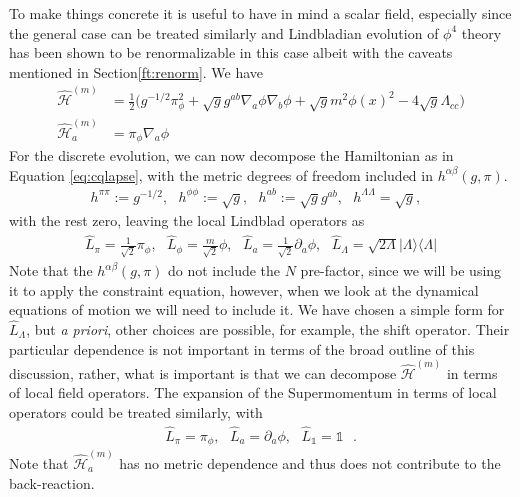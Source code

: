 \documentclass[aps,pra,showpacs,citeautoscript,amsmath,amssymb,floatfix,superscriptaddress,bbm, verbatim,amsfonts,changes,12pt,nofootinbib,longbibliography]{revtex4-2}
\newcommand{\id}{\mathbb{1}}
\newcommand{\proj}[1]{|#1\rangle\!\langle#1|}
\def\s{\,\,\,\,}
\def\L{{\hat{L}}}
\def\gfdet{\sqrt{g}}
\def\qham{\hat{\mathcal H}^{(m)}} %
\def\qmom{\hat{\mathcal{H}}^{(m)}}
\def\ab{^{\alpha\beta}}
\def\gpi{(g,\pi)}
\def\xd{}%
\begin{document}
To make things concrete it is useful to have in mind a scalar field, especially since the general case can be treated similarly and Lindbladian evolution of $\phi^4$ theory has been shown to be renormalizable in this case\cite{baidya2017renormalization}\label{par:caveats} albeit with the caveats mentioned in Section\ref{ft:renorm}. %
We have\cite{smear_foot}
\begin{align}
\qham
&=\frac{1}{2}\Big({g}^{-1/2}\pi_\phi^2+\sqrt{g}g^{ab}\nabla_a\phi\nabla_b\phi+\sqrt{g}m^2\phi(x)^2
-4\sqrt{g}\Lambda_{cc}\Big)
\label{eq:scalarTNN}\\
\qmom_a
&=\pi_\phi\nabla_a\phi
\end{align}
For the discrete evolution, we can now decompose the Hamiltonian as in Equation \eqref{eq:cqlapse}, with the metric degrees of freedom included in
$h\ab\gpi$. 
\begin{align}
h^{\pi\pi}:= 
g^{-1/2}, \s
h^{\phi\phi}:= 
\gfdet,\s
h^{ab}:=\gfdet g^{ab}
,\s
h^{\Lambda\Lambda}=\sqrt{g}
,\s
\label{eq:hlapse}
\end{align} 
with the rest zero, leaving the local Lindblad operators as
\begin{align}
\L_\pi\xd=\frac{1}{\sqrt{2}}\pi_\phi\xd,\s
\L_\phi\xd=\frac{m}{\sqrt{2}}\phi\xd, 
\s \L_a\xd=\frac{1}{\sqrt{2}}\partial_a\phi\xd
,\s %
\L_{\Lambda}={\sqrt{2\Lambda}}\proj{\Lambda}
\label{eq:scalarL}
\end{align}
Note that the $h\ab\gpi$ do not include the $N$ pre-factor, since we will be using it to apply the constraint equation, however, when we look at the dynamical equations of motion we will need to include it. We have chosen a simple form for $\L_{\Lambda}$, but {\it a priori}, other choices are possible, for example, the shift operator.
Their particular dependence is not important in terms of the broad outline of this discussion, rather, what is important is that we can decompose 
$\qham\xd$
in terms of local field operators. The expansion of the Supermomentum in terms of local operators could be treated similarly, 
with 
\begin{align}
\L_{\pi}\xd=\pi_\phi\xd,\s \L_{a}\xd=\partial_a\phi\xd
,\s \L_\id=\id\s.
\end{align}
Note that $\qmom_a\xd$ has no metric dependence and thus does not contribute to the back-reaction.%
\end{document}
